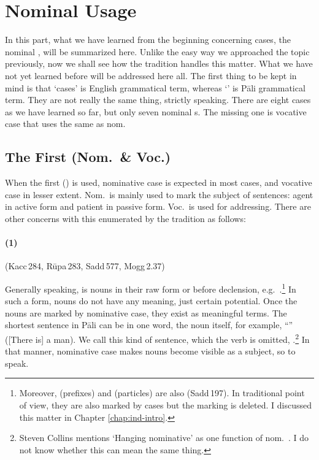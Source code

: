 \clearpage
{}
{}
\section*{Nominal  Usage}

In this part, what we have learned from the beginning concerning cases, the nominal , will be summarized here. Unlike the easy way we approached the topic previously, now we shall see how the tradition handles this matter. What we have not yet learned before will be addressed here all. The first thing to be kept in mind is that `cases' is English grammatical term, whereas `' is P\=ali grammatical term. They are not really the same thing, strictly speaking. There are eight cases as we have learned so far, but only seven nominal s. The missing one is vocative case that uses the same  as nom.

{}
\subsection*{The First  (Nom.\ \& Voc.)}

When the first ()  is used, nominative case is expected in most cases, and vocative case in lesser extent. Nom.\ is mainly used to mark the subject of sentences: agent in active form and patient in passive form. Voc.\ is used for addressing. There are other concerns with this  enumerated by the tradition as follows:

\paragraph*{(1) } (Kacc\,284, R\=upa\,283, Sadd\,577, Mogg\,2.37)\par
Generally speaking,  is nouns in their raw form or before declension, e.g.\ .\footnote{Moreover,  (prefixes) and  (particles) are also  (Sadd\,197). In traditional point of view, they are also marked by cases but the marking is deleted. I discussed this matter in Chapter \ref{chap:ind-intro}.} In such a form, nouns do not have any meaning, just certain potential. Once the nouns are marked by nominative case, they exist as meaningful terms. The shortest sentence in P\=ali can be in one word, the noun itself, for example, ``'' ([There is] a man). We call this kind of sentence, which the verb is omitted, .\footnote{Steven Collins mentions `Hanging nominative' as one function of nom.\ \citep[p.~20]{collins:grammar}. I do not know whether this can mean the same thing.} In that manner, nominative case makes nouns become visible as a subject, so to speak.

